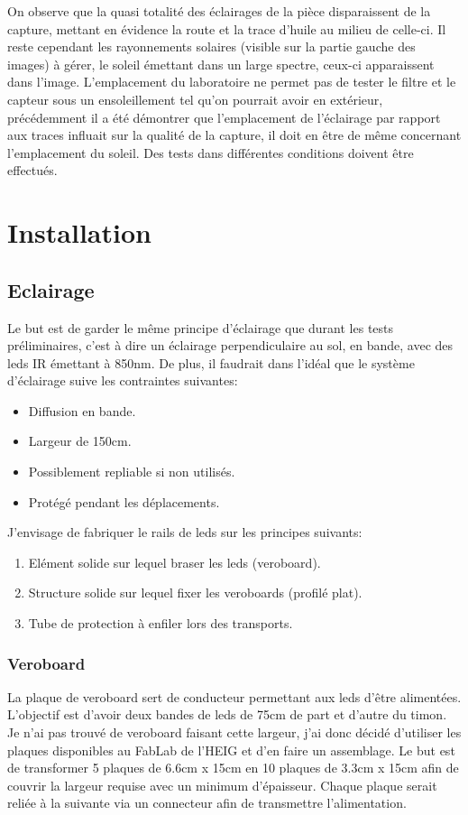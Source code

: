 On observe que la quasi totalité des éclairages de la pièce disparaissent de la capture,
mettant en évidence la route et la trace d'huile au milieu de celle-ci. Il reste cependant les rayonnements solaires (visible sur la partie gauche des images)
à gérer, le soleil émettant dans un large spectre, ceux-ci apparaissent dans l'image. L'emplacement du laboratoire ne permet pas de
tester le filtre et le capteur sous un ensoleillement tel qu'on pourrait avoir en extérieur, précédemment il a été démontrer que l'emplacement
de l'éclairage par rapport aux traces influait sur la qualité de la capture, il doit en être de même concernant l'emplacement du soleil. Des tests dans
différentes conditions doivent être effectués.

\section{Installation}
\subsection{Eclairage}
Le but est de garder le même principe d'éclairage que durant les tests préliminaires, c'est à dire un éclairage perpendiculaire au sol,
en bande, avec des leds IR émettant à 850nm. De plus, il faudrait dans l'idéal que le système d'éclairage suive les contraintes suivantes:
\begin{itemize}
    \item Diffusion en bande.
    \item Largeur de 150cm.
    \item Possiblement repliable si non utilisés.
    \item Protégé pendant les déplacements.
\end{itemize}
J'envisage de fabriquer le rails de leds sur les principes suivants:
\begin{enumerate}
    \item Elément solide sur lequel braser les leds (veroboard).
    \item Structure solide sur lequel fixer les veroboards (profilé plat).
    \item Tube de protection à enfiler lors des transports.
\end{enumerate}
\subsubsection{Veroboard}
La plaque de veroboard sert de conducteur permettant aux leds d'être alimentées. L'objectif est d'avoir deux bandes de leds de 75cm de part et d'autre
du timon. Je n'ai pas trouvé de veroboard faisant cette largeur, j'ai donc décidé d'utiliser les plaques disponibles au FabLab de l'HEIG et d'en faire un assemblage.
Le but est de transformer 5 plaques de 6.6cm x 15cm en 10 plaques de 3.3cm x 15cm afin de couvrir la largeur requise avec un minimum d'épaisseur.
Chaque plaque serait reliée à la suivante via un connecteur afin de transmettre l'alimentation.

